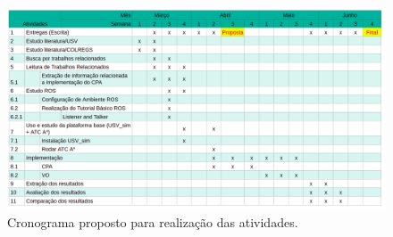         \begin{figure}[htb]
            \centering\includegraphics[width=1.3\textwidth, angle=90]{fig/chap3/schedule.png}
            \caption{\label{fig:chap3_schedule} Cronograma proposto para realização das atividades.}
        \end{figure}